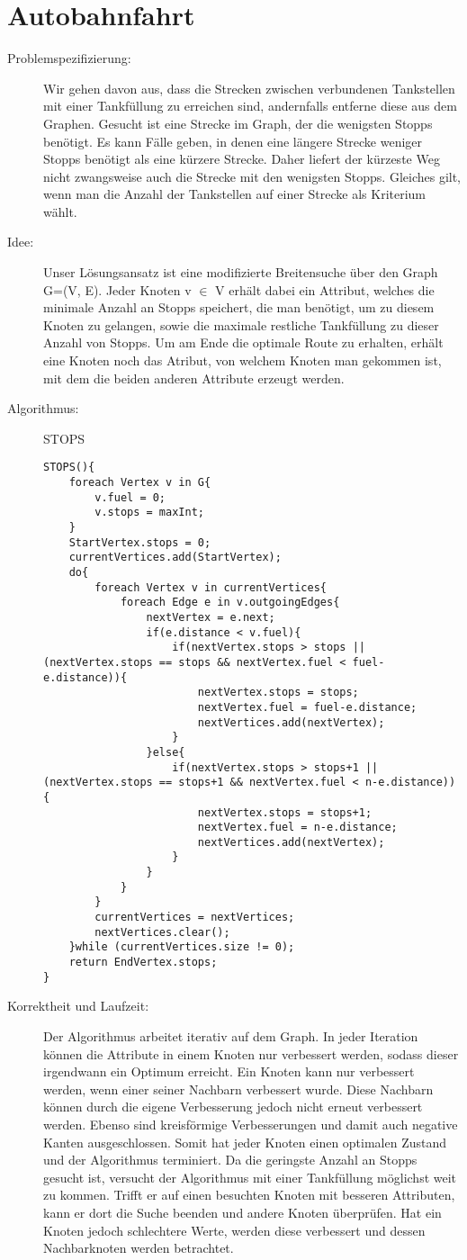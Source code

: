 \documentclass[a4paper,10pt]{article}
\begin{document}
\section{Autobahnfahrt}
\begin{description}
	\item[Problemspezifizierung:] Wir gehen davon aus, dass die Strecken zwischen verbundenen Tankstellen mit einer Tankfüllung zu erreichen sind, andernfalls entferne diese aus dem Graphen. Gesucht ist eine Strecke im Graph, der die wenigsten Stopps benötigt. Es kann Fälle geben, in denen eine längere Strecke weniger Stopps benötigt als eine kürzere Strecke. Daher liefert der kürzeste Weg nicht zwangsweise auch die Strecke mit den wenigsten Stopps. Gleiches gilt, wenn man die Anzahl der Tankstellen auf einer Strecke als Kriterium wählt.
	\item[Idee:] Unser Lösungsansatz ist eine modifizierte Breitensuche über den Graph G=(V, E). Jeder Knoten v $\in$ V erhält dabei ein Attribut, welches die minimale Anzahl an Stopps speichert, die man benötigt, um zu diesem Knoten zu gelangen, sowie die maximale restliche Tankfüllung zu dieser Anzahl von Stopps. Um am Ende die optimale Route zu erhalten, erhält eine Knoten noch das Atribut, von welchem Knoten man gekommen ist, mit dem die beiden anderen Attribute erzeugt werden.
	\item[Algorithmus:] STOPS\begin{lstlisting}[mathescape=true]
STOPS(){
	foreach Vertex v in G{
		v.fuel = 0;
		v.stops = maxInt;
	}
	StartVertex.stops = 0;
	currentVertices.add(StartVertex);
	do{
		foreach Vertex v in currentVertices{
			foreach Edge e in v.outgoingEdges{
				nextVertex = e.next;
				if(e.distance < v.fuel){
					if(nextVertex.stops > stops || (nextVertex.stops == stops && nextVertex.fuel < fuel-e.distance)){
						nextVertex.stops = stops;
						nextVertex.fuel = fuel-e.distance;
						nextVertices.add(nextVertex);
					}
				}else{
					if(nextVertex.stops > stops+1 || (nextVertex.stops == stops+1 && nextVertex.fuel < n-e.distance)){
						nextVertex.stops = stops+1;
						nextVertex.fuel = n-e.distance;
						nextVertices.add(nextVertex);
					}
				}
			}
		}
		currentVertices = nextVertices;
		nextVertices.clear();
	}while (currentVertices.size != 0);
	return EndVertex.stops;
}
\end{lstlisting}
	\item[Korrektheit und Laufzeit:] Der Algorithmus arbeitet iterativ auf dem Graph. In jeder Iteration können die Attribute in einem Knoten nur verbessert werden, sodass dieser irgendwann ein Optimum erreicht. Ein Knoten kann nur verbessert werden, wenn einer seiner Nachbarn verbessert wurde. Diese Nachbarn können durch die eigene Verbesserung jedoch nicht erneut verbessert werden. Ebenso sind kreisförmige Verbesserungen und damit auch negative Kanten ausgeschlossen. Somit hat jeder Knoten einen optimalen Zustand und der Algorithmus terminiert. Da die geringste Anzahl an Stopps gesucht ist, versucht der Algorithmus mit einer Tankfüllung möglichst weit zu kommen. Trifft er auf einen besuchten Knoten mit besseren Attributen, kann er dort die Suche beenden und andere Knoten überprüfen. Hat ein Knoten jedoch schlechtere Werte, werden diese verbessert und dessen Nachbarknoten werden betrachtet.

\end{description}
\end{document}
